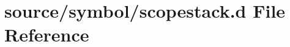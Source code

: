 \hypertarget{scopestack_8d}{\section{source/symbol/scopestack.d File Reference}
\label{scopestack_8d}
}

